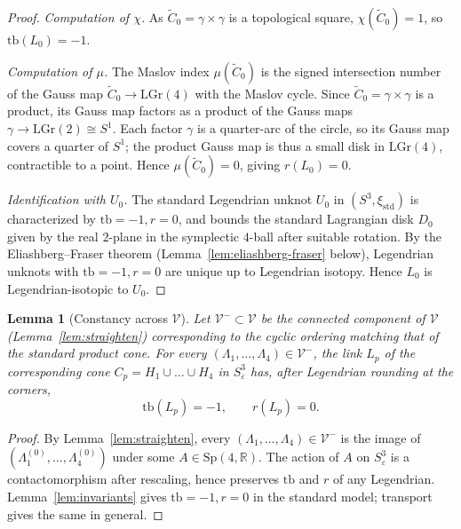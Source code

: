 \documentclass[12pt]{article}
\newtheorem{lemma}[theorem]{Lemma}
\theoremstyle{definition}
\begin{document}
\begin{proof}
\smallskip\noindent\emph{Computation of $\chi$.} As $\widetilde{C}_0=\gamma\times\gamma$ is a topological square, $\chi(\widetilde{C}_0)=1$, so $\mathrm{tb}(L_0)=-1$.

\smallskip\noindent\emph{Computation of $\mu$.} The Maslov index $\mu(\widetilde{C}_0)$ is the signed intersection number of the Gauss map $\widetilde{C}_0\to\mathrm{LGr}(4)$ with the Maslov cycle. Since $\widetilde{C}_0=\gamma\times\gamma$ is a product, its Gauss map factors as a product of the Gauss maps $\gamma\to\mathrm{LGr}(2)\cong S^1$. Each factor $\gamma$ is a quarter-arc of the circle, so its Gauss map covers a quarter of $S^1$; the product Gauss map is thus a small disk in $\mathrm{LGr}(4)$, contractible to a point. Hence $\mu(\widetilde{C}_0)=0$, giving $r(L_0)=0$.

\smallskip\noindent\emph{Identification with $U_0$.} The standard Legendrian unknot $U_0$ in $(S^3,\xi_{\mathrm{std}})$ is characterized by $\mathrm{tb}=-1,r=0$, and bounds the standard Lagrangian disk $D_0$ given by the real $2$-plane in the symplectic $4$-ball after suitable rotation. By the Eliashberg--Fraser theorem (Lemma~\ref{lem:eliashberg-fraser} below), Legendrian unknots with $\mathrm{tb}=-1,r=0$ are unique up to Legendrian isotopy. Hence $L_0$ is Legendrian-isotopic to $U_0$.
\end{proof}

\begin{lemma}[Constancy across $\mathcal{V}$]\label{lem:constancy}
Let $\mathcal{V}^-\subset\mathcal{V}$ be the connected component of $\mathcal{V}$ (Lemma~\ref{lem:straighten}) corresponding to the cyclic ordering matching that of the standard product cone. For every $(\Lambda_1,\dots,\Lambda_4)\in\mathcal{V}^-$, the link $L_p$ of the corresponding cone $C_p=H_1\cup\dots\cup H_4$ in $S^3_\varepsilon$ has, after Legendrian rounding at the corners,
\begin{equation}\label{eq:tb-r-general}
\mathrm{tb}(L_p)=-1,\qquad r(L_p)=0.
\end{equation}
\end{lemma}

\begin{proof}
By Lemma~\ref{lem:straighten}, every $(\Lambda_1,\dots,\Lambda_4)\in\mathcal{V}^-$ is the image of $(\Lambda_1^{(0)},\dots,\Lambda_4^{(0)})$ under some $A\in\mathrm{Sp}(4,\mathbb{R})$. The action of $A$ on $S^3_\varepsilon$ is a contactomorphism after rescaling, hence preserves $\mathrm{tb}$ and $r$ of any Legendrian. Lemma~\ref{lem:invariants} gives $\mathrm{tb}=-1,r=0$ in the standard model; transport gives the same in general.
\end{proof}
\end{document}
